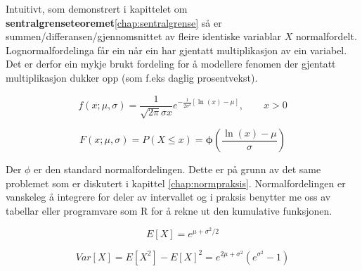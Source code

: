 Intuitivt, som demonstrert i kapittelet om \textbf{sentralgrenseteoremet}\ref{chap:sentralgrense} så er  summen/differansen/gjennomsnittet av fleire identiske variablar $X$ normalfordelt. Lognormalfordelinga får ein når ein har gjentatt multiplikasjon av ein variabel. Det er derfor ein mykje brukt fordeling for å modellere fenomen der gjentatt multiplikasjon dukker opp (som f.eks daglig prosentvekst).

\begin{equation}
    f(x; \mu, \sigma) = \frac{1}{\sqrt{2\pi}\sigma x}e^{-\frac{1}{2\sigma^2}[ \ln(x) - \mu]}, \qquad x > 0
\end{equation}

\begin{equation}
    F(x; \mu, \sigma) = P(X \leq x) = \boldsymbol{\phi}\left(\frac{\ln(x) - \mu}{\sigma}\right)
\end{equation}

Der $\phi$ er den standard normalfordelingen. Dette er på grunn av det same problemet som er diskutert i kapittel \ref{chap:normpraksis}. Normalfordelingen er vanskeleg å integrere for deler av intervallet og i praksis benytter me oss av tabellar eller programvare som R for å rekne ut den kumulative funksjonen.

\begin{equation}
    E[X] = e^{\mu + \sigma^2/2}
\end{equation}

\begin{equation}
    Var[X] = E[X^2] - E[X]^2 = e^{2\mu + \sigma^2}(e^{\sigma^2} - 1)
\end{equation}